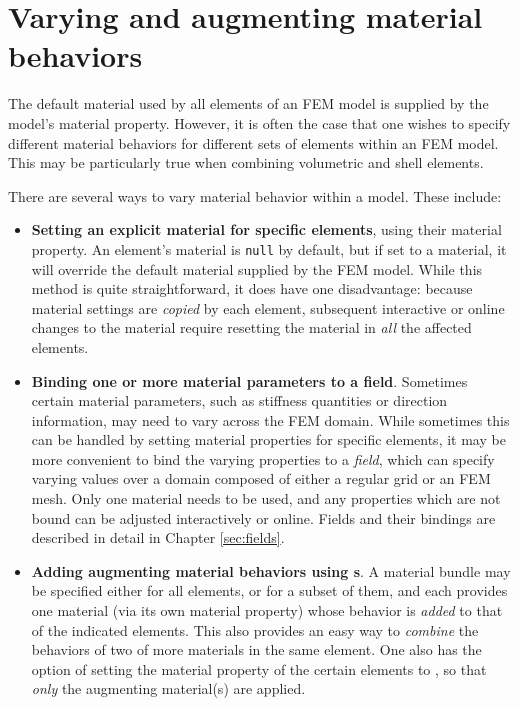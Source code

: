 \section{Varying and augmenting material behaviors}
\label{sec:augmentingMaterials}

The default material used by all elements of an FEM model is supplied
by the model's {\sf material} property.  However, it is often the case
that one wishes to specify different material behaviors for
different sets of elements within an FEM model. This may be
particularly true when combining volumetric and shell elements.

There are several ways to vary material behavior within a model.
These include:

\begin{itemize}

\item {\bf Setting an explicit material for specific elements}, using
their {\sf material} property.  An element's material is {\tt null} by
default, but if set to a material, it will override the
default material supplied by the FEM model. While this method is quite
straightforward, it does have one disadvantage: because material
settings are {\it copied} by each element, subsequent interactive or
online changes to the material require resetting the material in {\it all}
the affected elements.

\item {\bf Binding one or more material parameters to a field}.
Sometimes certain material parameters, such as stiffness quantities or
direction information, may need to vary across the FEM domain.  While
sometimes this can be handled by setting material properties for
specific elements, it may be more convenient to bind the varying
properties to a {\it field}, which can specify varying values over a
domain composed of either a regular grid or an FEM mesh.  Only one
material needs to be used, and any properties which are not bound can
be adjusted interactively or online. Fields and their bindings are described in detail in Chapter \ref{sec:fields}.

\item {\bf Adding augmenting material behaviors using 
s}.  A material
bundle may be specified either for all elements, or for a subset of
them, and each provides one material (via its own {\sf material}
property) whose behavior is {\it added} to that of the indicated
elements. This also provides an easy way to {\it combine} the
behaviors of two of more materials in the same element.  One also has
the option of setting the {\sf material} property of the certain
elements to , so
that {\it only} the augmenting material(s) are applied.


\end{itemize}
